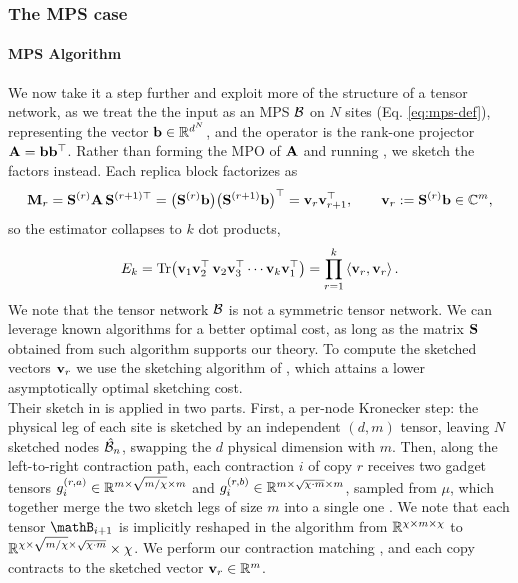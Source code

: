 \documentclass[11pt]{article}
\theoremstyle{plain}
\theoremstyle{definition}
\theoremstyle{remark}
\begin{document}
\subsubsection{The MPS case}
\label{sec:alg-mpo-2}

\paragraph{MPS Algorithm}
We now take it a step further and exploit more of the structure of a tensor network, as we treat the the input as an MPS $\mathcal{B}$ on $N$ sites
(Eq. \eqref{eq:mps-def}), representing the vector $\mathbf{\boldsymbol{b}}\in\mathbb{R}^{d^{N}}$, and the
operator is the rank-one projector $\mathbf{A}=\mathbf{\boldsymbol{b}}\mathbf{\boldsymbol{b}}^{\top}$. Rather than forming the MPO of $\mathbf{A}$ and running
, we sketch the factors instead. 
Each replica block factorizes as
\[
  \mathbf{M}_{r}
  =\mathbf{S}^{(r)}\mathbf{A}\,\mathbf{S}^{(r+1)\top}
  =\bigl(\mathbf{S}^{(r)}\mathbf{\boldsymbol{b}}\bigr)\bigl(\mathbf{S}^{(r+1)}\mathbf{\boldsymbol{b}}\bigr)^{\top}
  =\mathbf{\boldsymbol{v}}_{r}\mathbf{\boldsymbol{v}}_{r+1}^{\top},
  \qquad
  \mathbf{\boldsymbol{v}}_{r}:=\mathbf{S}^{(r)}\mathbf{\boldsymbol{b}}\in\mathbb{C}^{m},
\]
so the estimator collapses to $k$ dot products,
\[
  E_{k}
  =\mathop{\mathrm{Tr}}\bigl(\mathbf{\boldsymbol{v}}_{1}\mathbf{\boldsymbol{v}}_{2}^{\top}\,\mathbf{\boldsymbol{v}}_{2}\mathbf{\boldsymbol{v}}_{3}^{\top}\cdots
    \mathbf{\boldsymbol{v}}_{k}\mathbf{\boldsymbol{v}}_{1}^{\top}\bigr)
  =\prod_{r=1}^{k}\left\langle \mathbf{\boldsymbol{v}}_{r},\mathbf{\boldsymbol{v}}_{r} \right\rangle.
\]
We note that the tensor network $\mathcal{B}$  is not a symmetric tensor network. We can leverage known algorithms for a better optimal cost, as long as the matrix $\mathbf{S}$ obtained from such algorithm supports our theory.
To compute the sketched vectors $\mathbf{\boldsymbol{v}}_{r}$ we use the sketching algorithm
of \cite{masolomonik2022}, which attains a lower asymptotically optimal sketching cost. 
\\
Their sketch in \cite{masolomonik2022} is applied in two parts. First, a per-node Kronecker step: the physical leg of each site
is sketched by an independent $(d,m)$ tensor, leaving $N$ sketched nodes
$\hat{\mathcal{B}}_{n}$, swapping the $d$  physical dimension with $m$.
Then, along the left-to-right contraction path, each
contraction $i$ of copy $r$ receives two gadget tensors
$g_{i}^{(r,a)}\in\mathbb{R}^{m\times\sqrt{m/\chi}\times m}$ and
$g_{i}^{(r,b)}\in\mathbb{R}^{m\times \sqrt{\chi \cdot m}\times m}$, sampled from
$\mu$, which together merge the two sketch legs of size $m$ into a
single one \cite[App.~C.1]{masolomonik2022}. We note that each tensor $\mathB_{i+1}$  is implicitly reshaped in the algorithm from $\mathbb{R}^{\chi\times m\times \chi}$  to $\mathbb{R}^{\chi \times \sqrt{m/\chi}\times\sqrt{\chi\cdot m}}\times \chi$. We perform our contraction matching \cite[App.~(C.1)]{masolomonik2022}, and each copy contracts to the sketched vector $\mathbf{\boldsymbol{v}}_{r}\in\mathbb{R}^{m}$.
\end{document}

